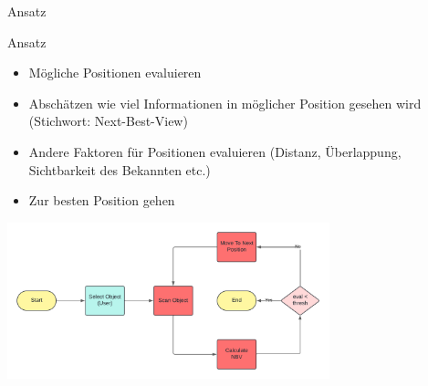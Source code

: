 \documentclass{beamer}
\begin{document}
\begin{frame}{Ansatz}
	\begin{block}{Ansatz}
		\begin{itemize}
			\item Mögliche Positionen evaluieren
			\item Abschätzen wie viel Informationen in möglicher Position gesehen wird (Stichwort: Next-Best-View)
			\item Andere Faktoren für Positionen evaluieren (Distanz, Überlappung, Sichtbarkeit des Bekannten etc.)
			\item Zur besten Position gehen
		\end{itemize}
	\end{block}
	\begin{center}
		\includegraphics[width=0.7\textwidth]{Graphics/flow_chart_v2.png}
	\end{center}
\end{frame}
\end{document}
